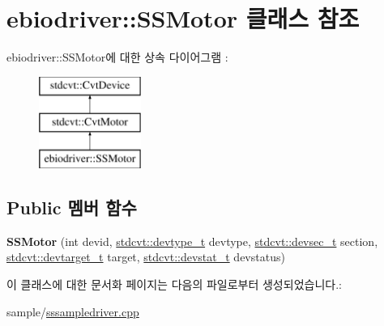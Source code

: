 \hypertarget{classebiodriver_1_1SSMotor}{}\section{ebiodriver\+:\+:S\+S\+Motor 클래스 참조}
\label{classebiodriver_1_1SSMotor}
ebiodriver\+:\+:S\+S\+Motor에 대한 상속 다이어그램 \+: \begin{figure}[H]
\begin{center}
\leavevmode
\includegraphics[height=3.000000cm]{classebiodriver_1_1SSMotor}
\end{center}
\end{figure}
\subsection*{Public 멤버 함수}
\begin{DoxyCompactItemize}
\item 
{\bfseries S\+S\+Motor} (int devid, \hyperlink{cvtcode_8h_ae8e34073e35cef0bb47c7fa535fc638b}{stdcvt\+::devtype\+\_\+t} devtype, \hyperlink{cvtcode_8h_a268eebb73363e24b9e65fd51973bd9c0}{stdcvt\+::devsec\+\_\+t} section, \hyperlink{cvtcode_8h_a2b37fd5cc4d40c0b8c4b987c271e5ceb}{stdcvt\+::devtarget\+\_\+t} target, \hyperlink{cvtcode_8h_ad21cd565f839adc5b19a0993e7da7278}{stdcvt\+::devstat\+\_\+t} devstatus)\hypertarget{classebiodriver_1_1SSMotor_a49e940a10a2c2abada3707429824fff0}{}\label{classebiodriver_1_1SSMotor_a49e940a10a2c2abada3707429824fff0}

\end{DoxyCompactItemize}


이 클래스에 대한 문서화 페이지는 다음의 파일로부터 생성되었습니다.\+:\begin{DoxyCompactItemize}
\item 
sample/\hyperlink{sssampledriver_8cpp}{sssampledriver.\+cpp}\end{DoxyCompactItemize}
